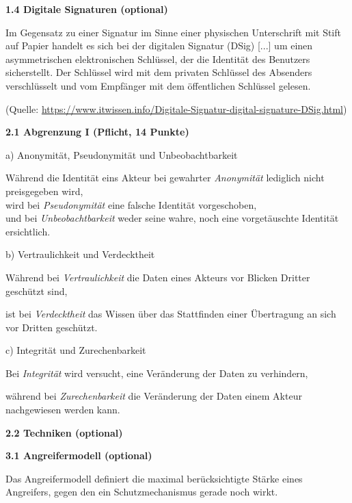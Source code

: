 \documentclass[ngerman]{fbi-aufgabenblatt}
\begin{document}
\textbf{1.4 Digitale Signaturen (optional)}

Im Gegensatz zu einer Signatur im Sinne einer physischen Unterschrift mit Stift auf Papier handelt es sich
\dq bei der digitalen Signatur (DSig) [...] um einen asymmetrischen elektronischen Schlüssel, 
der die Identität des Benutzers sicherstellt. Der Schlüssel wird mit dem privaten Schlüssel des Absenders verschlüsselt 
und vom Empfänger mit dem öffentlichen Schlüssel gelesen.\dq

(Quelle: \url{https://www.itwissen.info/Digitale-Signatur-digital-signature-DSig.html})


\newpage
%
%

\textbf{2.1 Abgrenzung I (Pflicht, 14 Punkte)}

a) Anonymität, Pseudonymität und Unbeobachtbarkeit

Während die Identität eins Akteur bei gewahrter \emph{Anonymität} lediglich nicht preisgegeben wird,\\
wird bei \emph{Pseudonymität} eine falsche Identität vorgeschoben,\\
und bei \emph{Unbeobachtbarkeit} weder seine wahre, noch eine vorgetäuschte Identität ersichtlich.

b) Vertraulichkeit und Verdecktheit

Während bei \emph{Vertraulichkeit} die Daten eines Akteurs vor Blicken Dritter geschützt sind,

ist bei \emph{Verdecktheit} das Wissen über das Stattfinden einer Übertragung an sich vor Dritten geschützt.

c) Integrität und Zurechenbarkeit

Bei \emph{Integrität} wird versucht, eine Veränderung der Daten zu verhindern, 

während bei \emph{Zurechenbarkeit} die Veränderung der Daten einem Akteur nachgewiesen werden kann.

\textbf{2.2 Techniken (optional)}


\newpage
{}

\textbf{3.1 Angreifermodell (optional)}

Das Angreifermodell definiert die maximal berücksichtigte Stärke eines
Angreifers, gegen den ein Schutzmechanismus gerade noch wirkt.
\end{document}
